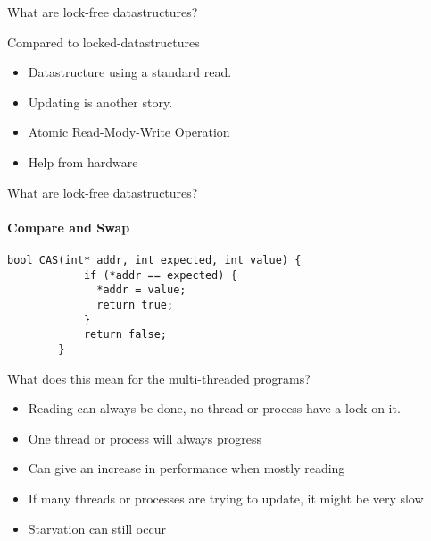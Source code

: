 \begin{frame}{What are lock-free datastructures?}
	\begin{block}{Compared to locked-datastructures}
		\begin{itemize}
			\item Datastructure using a standard \textcolor{ReneOrange}{read}.
			\item \textcolor{ReneOrange}{Updating} is another story.
			\item Atomic Read-Mody-Write Operation
			\item Help from hardware
		\end{itemize}
	\end{block}
\end{frame}

\begin{frame}[fragile]{What are lock-free datastructures?}
	\framesubtitle{Compare and Swap}
	\begin{block}	
		\begin{lstlisting}[style=customc]
		bool CAS(int* addr, int expected, int value) {
			if (*addr == expected) {
			  *addr = value;
			  return true;
			}
			return false;
		} 
		\end{lstlisting}
	\end{block}
\end{frame}

\begin{frame}

	\begin{block}{What does this mean for the multi-threaded programs?}
		\begin{itemize}
			\item Reading can always be done, no thread or process have a \textcolor{ReneOrange}{lock} on it.
			\item One thread or process will always progress
			\item Can give an increase in performance when mostly reading
			\item If many threads or processes are trying to update, it might be very slow
			\item \textcolor{ReneOrange}{Starvation} can still occur
		\end{itemize}
	\end{block}
\end{frame}